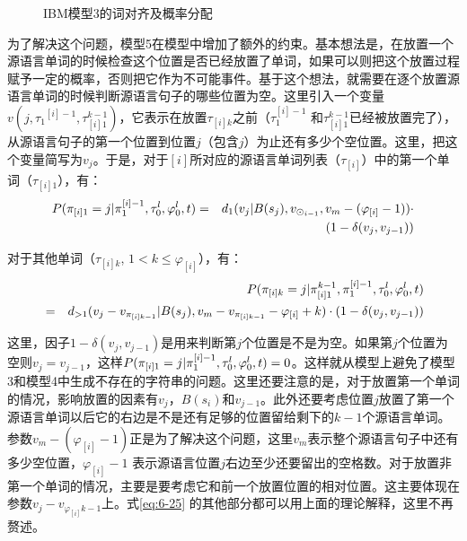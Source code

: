 \begin{figure}[htp]
    \centering

    \caption{IBM模型3的词对齐及概率分配}
    \label{fig:6-9}
\end{figure}

\parinterval 为了解决这个问题，模型5在模型中增加了额外的约束。基本想法是，在放置一个源语言单词的时候检查这个位置是否已经放置了单词，如果可以则把这个放置过程赋予一定的概率，否则把它作为不可能事件。基于这个想法，就需要在逐个放置源语言单词的时候判断源语言句子的哪些位置为空。这里引入一个变量$v(j, {\tau_1}^{[i]-1}, \tau_{[i]1}^{k-1})$，它表示在放置$\tau_{[i]k}$之前（$\tau_1^{[i]-1}$ 和$\tau_{[i]1}^{k-1}$已经被放置完了），从源语言句子的第一个位置到位置$j$（包含$j$）为止还有多少个空位置。这里，把这个变量简写为$v_j$。于是，对于$[i]$所对应的源语言单词列表（$\tau_{[i]}$）中的第一个单词（$\tau_{[i]1}$），有：
\begin{eqnarray}
{P}(\pi_{[i]1} = j | \pi_1^{[i]-1}, \tau_0^l, \varphi_0^l, {t}) & = & d_1(v_j|B(s_j), v_{\odot_{i-1}}, v_m-(\varphi_{[i]}-1)) \cdot \nonumber \\
                                                                                                   &     & (1-\delta(v_j,v_{j-1}))
\label{eq:6-24}
\end{eqnarray}

\parinterval 对于其他单词（$\tau_{[i]k}$, $1 < k\le\varphi_{[i]}$），有：
\begin{eqnarray}
&   & {P}(\pi_{[i]k}=j|\pi_{[i]1}^{k-1}, \pi_1^{[i]-1}, \tau_0^l, \varphi_0^l,{t}) \nonumber \\
&= & d_{>1}(v_j-v_{\pi_{[i]k-1}}|B(s_j), v_m-v_{\pi_{[i]k-1}}-\varphi_{[i]}+k) \cdot (1-\delta(v_j,v_{j-1}))
\label{eq:6-25}
\end{eqnarray}

\noindent 这里，因子$1-\delta(v_j, v_{j-1})$是用来判断第$j$个位置是不是为空。如果第$j$个位置为空则$v_j = v_{j-1}$，这样${P}(\pi_{[i]1}=j|\pi_1^{[i]-1}, \tau_0^l, \varphi_0^l, {t}) = 0$。这样就从模型上避免了模型3和模型4中生成不存在的字符串的问题。这里还要注意的是，对于放置第一个单词的情况，影响放置的因素有$v_j$，$B(s_i)$和$v_{j-1}$。此外还要考虑位置$j$放置了第一个源语言单词以后它的右边是不是还有足够的位置留给剩下的$k-1$个源语言单词。参数$v_m-(\varphi_{[i]}-1)$正是为了解决这个问题，这里$v_m$表示整个源语言句子中还有多少空位置，$\varphi_{[i]}-1$ 表示源语言位置$j$右边至少还要留出的空格数。对于放置非第一个单词的情况，主要是要考虑它和前一个放置位置的相对位置。这主要体现在参数$v_j-v_{\varphi_{[i]}k-1}$上。式\eqref{eq:6-25} 的其他部分都可以用上面的理论解释，这里不再赘述。

